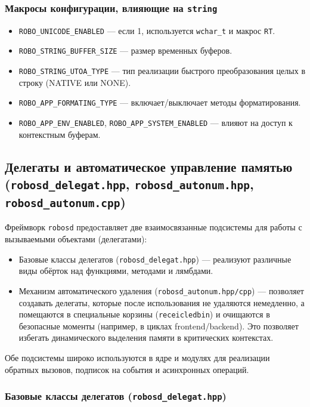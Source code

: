 \documentclass[a4paper,12pt]{article}
\begin{document}
\subsubsection{Макросы конфигурации, влияющие на \texttt{string}}

\begin{itemize}
    \item \texttt{ROBO\_UNICODE\_ENABLED} — если 1, используется \texttt{wchar\_t} и макрос \texttt{RT}.
    \item \texttt{ROBO\_STRING\_BUFFER\_SIZE} — размер временных буферов.
    \item \texttt{ROBO\_STRING\_UTOA\_TYPE} — тип реализации быстрого преобразования целых в строку (NATIVE или NONE).
    \item \texttt{ROBO\_APP\_FORMATING\_TYPE} — включает/выключает методы форматирования.
    \item \texttt{ROBO\_APP\_ENV\_ENABLED}, \texttt{ROBO\_APP\_SYSTEM\_ENABLED} — влияют на доступ к контекстным буферам.
\end{itemize}

\subsection{Делегаты и автоматическое управление памятью (\texttt{robosd\_delegat.hpp}, \texttt{robosd\_autonum.hpp}, \texttt{robosd\_autonum.cpp})}

Фреймворк \texttt{robosd} предоставляет две взаимосвязанные подсистемы для работы с вызываемыми объектами (делегатами):
\begin{itemize}
    \item Базовые классы делегатов (\texttt{robosd\_delegat.hpp}) — реализуют различные виды обёрток над функциями, методами и лямбдами.
    \item Механизм автоматического удаления (\texttt{robosd\_autonum.hpp/cpp}) — позволяет создавать делегаты, которые после использования не удаляются немедленно, а помещаются в специальные корзины (\texttt{receicledbin}) и очищаются в безопасные моменты (например, в циклах frontend/backend). Это позволяет избегать динамического выделения памяти в критических контекстах.
\end{itemize}

Обе подсистемы широко используются в ядре и модулях для реализации обратных вызовов, подписок на события и асинхронных операций.

\subsubsection{Базовые классы делегатов (\texttt{robosd\_delegat.hpp})}
\end{document}

